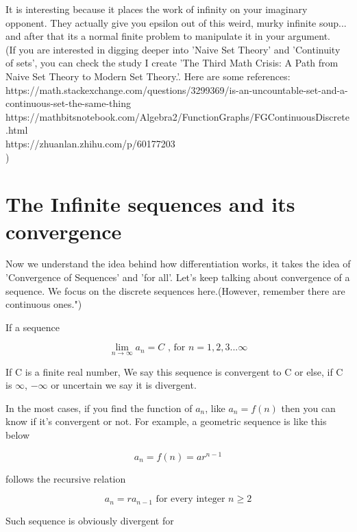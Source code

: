 \documentclass{article}
\begin{document}
  It is interesting because it places the work of infinity on your imaginary opponent. They actually give you epsilon out of this weird, murky infinite soup... and after that its a normal finite problem to manipulate it in your argument. \\


  (If you are interested in digging deeper into 'Naive Set Theory' and 'Continuity of sets', you can check the study I create 'The Third Math Crisis: A Path from Naive Set Theory to Modern Set Theory.'. Here are some references:\\
  https://math.stackexchange.com/questions/3299369/is-an-uncountable-set-and-a-continuous-set-the-same-thing \\
  https://mathbitsnotebook.com/Algebra2/FunctionGraphs/FGContinuousDiscrete.html \\
  https://zhuanlan.zhihu.com/p/60177203 \\
  ) \\


  \section{The Infinite sequences and its convergence}
  Now we understand the idea behind how differentiation works, it takes the idea of 'Convergence of Sequences' and 'for all'. Let's keep talking about convergence of a sequence. We focus on the discrete sequences here.(However, remember there are continuous ones.") 

  If a sequence

  \[
	  \lim_{n \to \infty} a_n = C \text{ , for }n=1, 2, 3...\infty
  \] 


  If C is a finite real number, We say this sequence is convergent to C or else, if C is $\infty$, $-\infty$ or uncertain we say it is divergent. 

  In the most cases, if you find the function of $a_n$, like $a_n = f(n)$ then you can know if it's convergent or not. For example, a geometric sequence is like this below

  \[
	  a_n=f(n)=ar^{n-1}
  \]

  follows the recursive relation
  

  \[
	  a_n=ra_{n-1} \text{ for every integer } n\geq2
  \]

  Such sequence is obviously divergent for 
\end{document}
